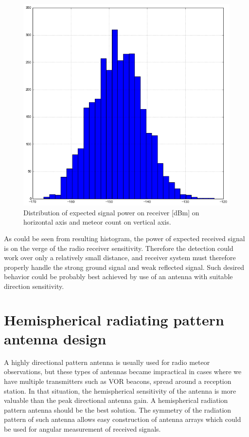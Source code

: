 \documentclass[twoside]{ctuthesis}
\theoremstyle{plain}
\theoremstyle{definition}
\theoremstyle{note}
\begin{document}
\begin{figure}
\includegraphics[width=\textwidth]{./img/Meteor_signal_intensity.png}
\caption{Distribution of expected signal power on receiver [dBm] on horizontal axis and meteor count on vertical axis.}
\label{VOR_meteors_intensity}
\end{figure}

As could be seen from resulting histogram, the power of expected received signal is on the verge of the radio receiver sensitivity. Therefore the detection could work over only a relatively small distance, and receiver system must therefore properly handle the strong ground signal and weak reflected signal. Such desired behavior could be probably best achieved by use of an antenna with suitable direction sensitivity.

\section{Hemispherical radiating pattern antenna design}

A highly directional pattern antenna is usually used for radio meteor observations, but these types of antennas became impractical in cases where we have multiple transmitters such as VOR beacons, spread around a reception station. In that situation, the hemispherical sensitivity of the antenna is more valuable than the peak directional antenna gain. A hemispherical radiation pattern antenna should be the best solution.  The symmetry of the radiation pattern of such antenna allows easy construction of antenna arrays which could be used for angular measurement of received signals.
\end{document}
